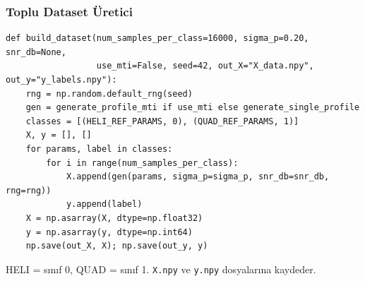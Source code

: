 \documentclass[11pt,a4paper]{article}
\begin{document}
\subsubsection{Toplu Dataset Üretici}
\begin{lstlisting}[caption={İki sınıfa eşit dağıtılmış dataset üret ve diske kaydet}]
def build_dataset(num_samples_per_class=16000, sigma_p=0.20, snr_db=None,
                  use_mti=False, seed=42, out_X="X_data.npy", out_y="y_labels.npy"):
    rng = np.random.default_rng(seed)
    gen = generate_profile_mti if use_mti else generate_single_profile
    classes = [(HELI_REF_PARAMS, 0), (QUAD_REF_PARAMS, 1)]
    X, y = [], []
    for params, label in classes:
        for i in range(num_samples_per_class):
            X.append(gen(params, sigma_p=sigma_p, snr_db=snr_db, rng=rng))
            y.append(label)
    X = np.asarray(X, dtype=np.float32)
    y = np.asarray(y, dtype=np.int64)
    np.save(out_X, X); np.save(out_y, y)
\end{lstlisting}
HELI = sınıf 0, QUAD = sınıf 1. \texttt{X.npy} ve \texttt{y.npy} dosyalarına kaydeder.

\end{document}
